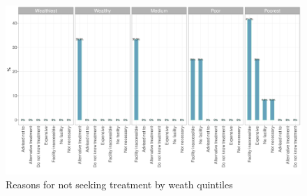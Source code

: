 \documentclass[12pt,a4paper]{article}
\begin{document}
\begin{figure}[H]

{\centering \includegraphics{kayahReport_files/figure-latex/diarrhoea4plot-1} 

}

\caption{Reasons for not seeking treatment by weath quintiles}\label{fig:diarrhoea4plot}
\end{figure}
\end{document}
